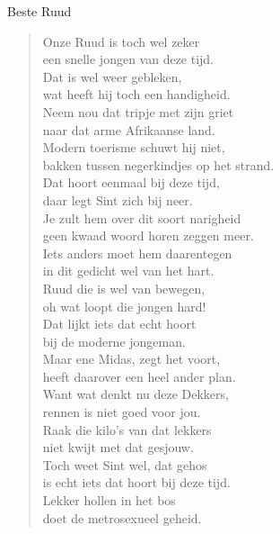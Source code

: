 \documentclass[12pt]{brief}
\date{12 augustus 2006}
\begin{document}
\begin{letter}{Beste Ruud}

\opening{}


\begin{verse}

Onze Ruud is toch wel zeker\\
een snelle jongen van deze tijd.\\
Dat is wel weer gebleken,\\
wat heeft hij toch een handigheid.\\[1.5em]

Neem nou dat tripje met zijn griet\\
naar dat arme Afrikaanse land.\\
Modern toerisme schuwt hij niet,\\
bakken tussen negerkindjes op het strand.\\[1.5em]

Dat hoort eenmaal bij deze tijd,\\
daar legt Sint zich bij neer.\\
Je zult hem over dit soort narigheid\\
geen kwaad woord horen zeggen meer.\\[1.5em]

Iets anders moet hem daarentegen\\
in dit gedicht wel van het hart.\\
Ruud die is wel van bewegen,\\
oh wat loopt die jongen hard!\\[1.5em]

Dat lijkt iets dat echt hoort\\
bij de moderne jongeman.\\
Maar ene Midas, zegt het voort,\\
heeft daarover een heel ander plan.\\[3.5em]

Want wat denkt nu deze Dekkers,\\
rennen is niet goed voor jou.\\
Raak die kilo's van dat lekkers\\
niet kwijt met dat gesjouw.\\[1.5em]

Toch weet Sint wel, dat gehos\\
is echt iets dat hoort bij deze tijd.\\
Lekker hollen in het bos\\
doet de metrosexueel geheid.\\[1.5em]


\end{verse}
\end{letter}
\end{document}
